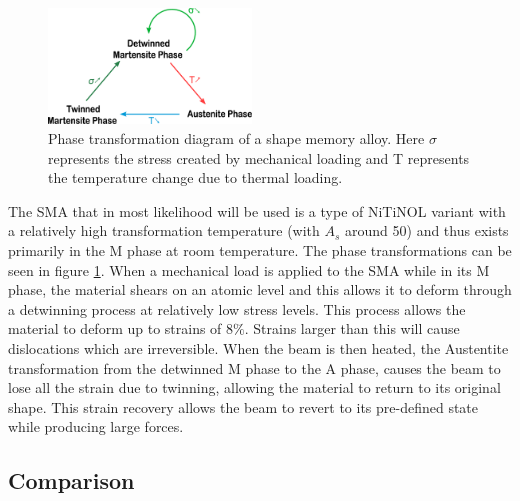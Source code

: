 \begin{figure}
  \centering
  \includegraphics[width=0.48\textwidth]{Figures/Phase_Transf_Diagram_noText.eps}
  \caption{Phase transformation diagram of a shape memory alloy. Here $\sigma$ represents the stress created by mechanical loading and T represents the temperature change due to thermal loading.}
	\vspace{-10pt}
  \label{fig:PhaseTransfDiagram}
\end{figure}


The SMA that in most likelihood will be used is a type of NiTiNOL variant with a relatively high transformation temperature (with $A_s$ around 50\degreeC) and thus exists primarily in the M phase at room temperature. The phase transformations can be seen in figure \ref{fig:PhaseTransfDiagram}. When a mechanical load is applied to the SMA while in its M phase, the material shears on an atomic level and this allows it to deform through a detwinning process at relatively low stress levels. This process allows the material to deform up to strains of 8$\%$. Strains larger than this will cause dislocations which are irreversible. When the beam is then heated, the Austentite transformation from the detwinned M phase to the A phase, causes the beam to lose all the strain due to twinning, allowing the material to return to its original shape. This strain recovery allows the beam to revert to its pre-defined state while producing large forces.

\subsection{Comparison}
